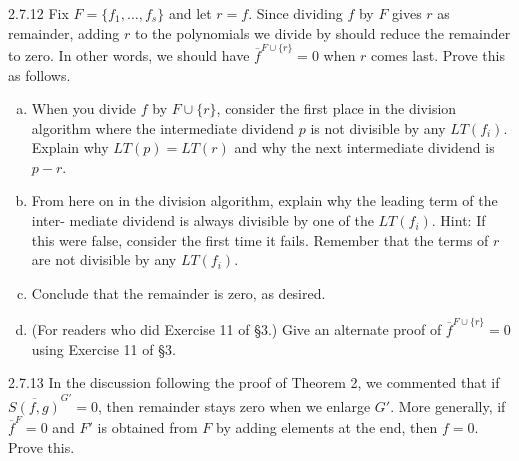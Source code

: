\documentclass[twoside]{article}
\begin{document}
\begin{ejercicio}{2.7.12}
Fix $F = \{ f_1 , \dots , f_s \}$ and let $r = f$. Since dividing $f$ by $F$ gives $r$ as remainder, adding
$r$ to the polynomials we divide by should reduce the remainder to zero. In other words,
we should have $\overline{f}^{F∪\{r\}}
= 0$ when $r$ comes last. Prove this as follows.
\begin{enumerate}[a.]
\item When you divide $f$ by $F ∪\{r\}$, consider the first place in the division algorithm where
the intermediate dividend $p$ is not divisible by any $LT ( f_i )$. Explain why $LT (p) =
LT (r)$ and why the next intermediate dividend is $p − r$.
\item From here on in the division algorithm, explain why the leading term of the inter-
mediate dividend is always divisible by one of the $LT ( f_i )$. Hint: If this were false,
consider the first time it fails. Remember that the terms of $r$ are not divisible by any
$LT ( f_i )$.
\item Conclude that the remainder is zero, as desired.
\item (For readers who did Exercise 11 of §3.) Give an alternate proof of $\overline{f}^{F∪\{r\}}
= 0$ using
Exercise 11 of §3.
\end{enumerate}
\end{ejercicio}
\begin{solucion}

\end{solucion}

\newpage

\begin{ejercicio}{2.7.13}
In the discussion following the proof of Theorem 2, we commented that if $\overline{S( f , g)}^{G'} = 0$,
then remainder stays zero when we enlarge $G'$. More generally, if $\overline{f}^F = 0$ and $F'$ is
obtained from $F$ by adding elements at the end, then $f = 0$. Prove this.
\end{ejercicio}
\begin{solucion}

\end{solucion}

\newpage
\end{document}
